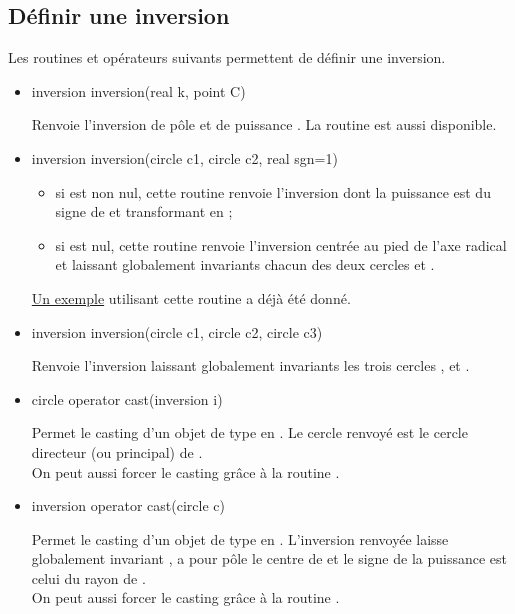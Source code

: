 \documentclass[pdftex]{article}
\begin{document}
\subsection{Définir une inversion}
Les routines et opérateurs suivants permettent de définir une
inversion.
\begin{itemize}
\item {}
  \begin{Vcolor}
    inversion inversion(real k, point C)
  \end{Vcolor}
  Renvoie l'inversion de pôle  et de puissance . La
  routine  est aussi disponible.
\item {}
  \begin{Vcolor}
    inversion inversion(circle c1, circle c2, real sgn=1)
  \end{Vcolor}
  \begin{itemize}
  \item si  est non nul, cette routine renvoie
    l'inversion dont la puissance est du signe de  et
    transformant  en ;
  \item si  est nul, cette routine renvoie l'inversion
    centrée au pied de l'axe radical et laissant globalement
    invariants chacun des deux cercles  et .
  \end{itemize}
  \href{#exemple_inversion}{Un exemple} utilisant cette routine a déjà
  été donné.
\item {}
  \begin{Vcolor}
    inversion inversion(circle c1, circle c2, circle c3)
  \end{Vcolor}
  Renvoie l'inversion laissant globalement invariants les trois
  cercles ,  et .
\item {}
  \begin{Vcolor}
    circle operator cast(inversion i)
  \end{Vcolor}
  Permet le \og{}casting\fg{} d'un objet de type  en
  . Le cercle renvoyé est le cercle directeur (ou principal)
  de .\\
  On peut aussi forcer le \og{}casting\fg{} grâce à la routine
  .
\item {}
  \begin{Vcolor}
    inversion operator cast(circle c)
  \end{Vcolor}
  Permet le \og{}casting\fg{} d'un objet de type  en
  . L'inversion renvoyée laisse globalement
  invariant , a pour pôle le centre de  et le signe
  de la puissance est celui du rayon de .\\
  On peut aussi forcer le \og{}casting\fg{} grâce à la routine
  .

\end{itemize}
\end{document}
